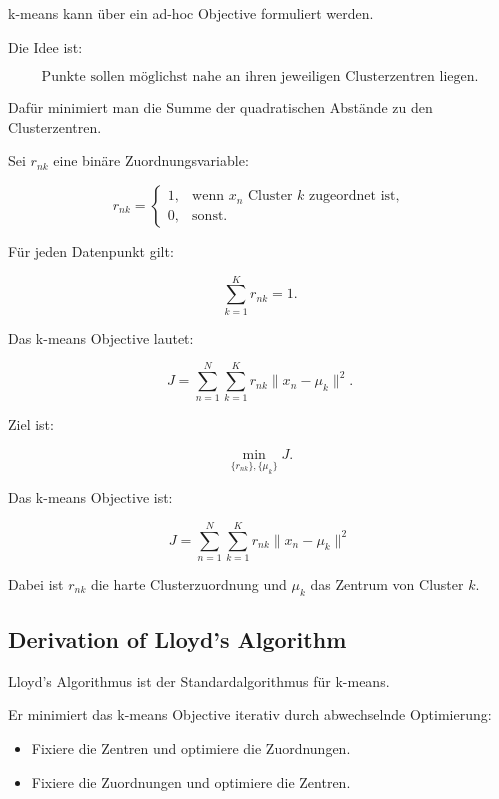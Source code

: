 \documentclass[11pt,a4paper]{scrartcl}
\begin{document}
\begin{notebox}
    k-means kann über ein ad-hoc Objective formuliert werden.

    Die Idee ist:

    \[
        \text{Punkte sollen möglichst nahe an ihren jeweiligen Clusterzentren liegen.}
    \]

    Dafür minimiert man die Summe der quadratischen Abstände zu den
    Clusterzentren.
\end{notebox}

\begin{calculationbox}
    Sei \(r_{nk}\) eine binäre Zuordnungsvariable:

    \[
        r_{nk}
        =
        \begin{cases}
            1, & \text{wenn } x_n \text{ Cluster } k \text{ zugeordnet ist},\\
            0, & \text{sonst}.
        \end{cases}
    \]

    Für jeden Datenpunkt gilt:

    \[
        \sum_{k=1}^{K} r_{nk} = 1.
    \]

    Das k-means Objective lautet:

    \[
        J
        =
        \sum_{n=1}^{N}
        \sum_{k=1}^{K}
        r_{nk}
        \|x_n-\mu_k\|^2.
    \]

    Ziel ist:

    \[
        \min_{\{r_{nk}\},\{\mu_k\}}
        J.
    \]
\end{calculationbox}

\begin{answerbox}
    Das k-means Objective ist:

    \[
        \boxed{
            J
            =
            \sum_{n=1}^{N}
            \sum_{k=1}^{K}
            r_{nk}
            \|x_n-\mu_k\|^2
        }
    \]

    Dabei ist \(r_{nk}\) die harte Clusterzuordnung und \(\mu_k\) das Zentrum
    von Cluster \(k\).
\end{answerbox}

\subsection{Derivation of Lloyd's Algorithm}

\begin{notebox}
    Lloyd's Algorithmus ist der Standardalgorithmus für k-means.

    Er minimiert das k-means Objective iterativ durch abwechselnde Optimierung:

    \begin{itemize}
        \item Fixiere die Zentren und optimiere die Zuordnungen.
        \item Fixiere die Zuordnungen und optimiere die Zentren.
    \end{itemize}
\end{notebox}
\end{document}
